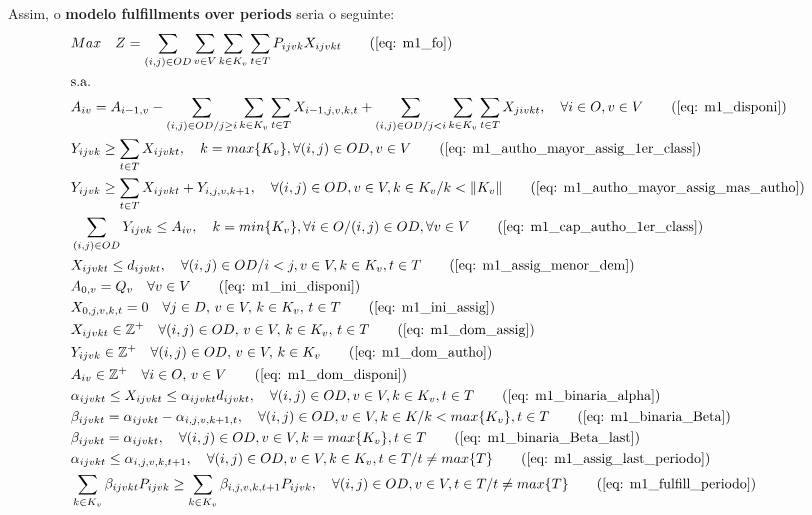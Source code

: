 Assim, o \textbf{modelo fulfillments over periods} seria o seguinte:
\allowdisplaybreaks
\begin{align}
	& Max \quad Z = \sum_{(i,j)\in OD} \sum_{v\in V} \sum_{k\in K_v} \sum_{t\in T} P_{ijvk} X_{ijvkt}     \tag{\ref{eq: m1_fo}}   \\
	& \text{s.a.}  \notag \\
	& A_{iv} = A_{i-1,v} - \sum_{(i,j) \in OD/j \geq i} \sum_{k\in K_v}\sum_{t\in T}X_{i-1,j,v,k,t} + \sum_{(i,j) \in OD/j<i} \sum_{k\in K_v}\sum_{t\in T}X_{jivkt}, \quad \forall i \in O, v \in V   \tag{\ref{eq: m1_disponi}} \\
	& Y_{ijvk} \geq  \sum_{t \in T} X_{ijvkt},  \quad k = max\{K_v\}, \forall(i,j) \in OD ,v \in V     \tag{\ref{eq: m1_autho_mayor_assig_1er_class}} \\
	& Y_{ijvk} \geq  \sum_{t \in T} X_{ijvkt} + Y_{i,j,v,k + 1} , \quad \forall(i,j) \in OD, v \in V, k \in K_v / k < \lVert K_v \rVert   \tag{\ref{eq: m1_autho_mayor_assig_mas_autho}} \\
	& \sum_{(i,j) \in OD} Y_{ijvk} \leq A_{iv}, \quad  k = min\{K_v\}, \forall i \in O / (i,j) \in OD,   \forall v \in V       \tag{\ref{eq: m1_cap_autho_1er_class}} \\
	& X_{ijvkt} \leq d_{ijvkt},  \quad \forall (i,j) \in OD / i < j  ,v \in V, k \in K_v, t\in T   \tag{\ref{eq: m1_assig_menor_dem}} \\
	& A_{0,v} = Q_v \quad \forall v \in V  \tag{\ref{eq: m1_ini_disponi}} \\ 
	& X_{0,j,v,k,t} = 0 \quad \forall j \in D,\, v \in V,\, k \in K_v,\, t \in T  \tag{\ref{eq: m1_ini_assig}} \\ 
	& X_{ijvkt} \in \mathbb{Z}^+ \quad \forall(i,j) \in OD,\, v \in V,\, k \in K_v,\, t \in T  \tag{\ref{eq: m1_dom_assig}} \\ 
	& Y_{ijvk} \in \mathbb{Z}^+ \quad \forall(i,j) \in OD,\, v \in V,\, k \in K_v  \tag{\ref{eq: m1_dom_autho}} \\ 
	& A_{iv} \in \mathbb{Z}^+ \quad \forall i \in O,\, v \in V  \tag{\ref{eq: m1_dom_disponi}} \\
	& \alpha_{ijvkt} \leq X_{ijvkt} \leq \alpha_{ijvkt}d_{ijvkt}, \quad   \forall(i,j) \in OD, v \in V, k \in K_v, t \in T   \tag{\ref{eq: m1_binaria_alpha}} \\
	& \beta_{ijvkt} = \alpha_{ijvkt} - \alpha_{i,j,v,k+1,t}, \quad \forall (i,j) \in OD, v \in V, k \in K /k < max\{K_v\}, t\in T    \tag{\ref{eq: m1_binaria_Beta}}   \\
	& \beta_{ijvkt} = \alpha_{ijvkt}, \quad   \forall(i,j) \in OD, v \in V, k = max\{K_v\}, t \in T    \tag{\ref{eq: m1_binaria_Beta_last}}   \\
	& \alpha_{ijvkt} \leq \alpha_{i,j,v,k,t+1}, \quad   \forall(i,j) \in OD, v \in V, k \in K_v, t \in T/ t \neq max\{T\}     \tag{\ref{eq: m1_assig_last_periodo}}   \\
	& \sum_{k \in K_v}\beta_{ijvkt}P_{ijvk} \geq \sum_{k \in K_v}\beta_{i,j,v,k,t+1}P_{ijvk},  \quad   \forall(i,j) \in OD, v \in V, t \in T/ t \neq max\{T\}   \tag{\ref{eq: m1_fulfill_periodo}}
\end{align}


